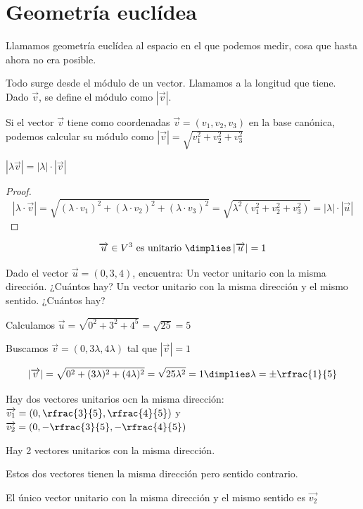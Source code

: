 
\section{Geometría euclídea}

Llamamos geometría euclídea al espacio en el que podemos medir, cosa que hasta ahora no era posible.

Todo surge desde el módulo de un vector. Llamamos  a la longitud que tiene. Dado $\vec{v}$, se define el módulo como $|\vec{v}|$.

Si el vector $\vec{v}$ tiene como coordenadas $\vec{v} = (v_1,v_2,v_3)$ en la base canónica, podemos calcular su módulo como $|\vec{v}| = \sqrt{v_1^2+v_2^2+v_3^2}$

\begin{prop}
$\left|\lambda\vec{v}\right| = |\lambda|·|\vec{v}|$
\end{prop}
\begin{proof}
$$|\lambda·\vec{v}| = \sqrt{(\lambda·v_1)^2+(\lambda·v_2)^2+(\lambda·v_3)^2} = \sqrt{\lambda^2 (v_1^2+v_2^2+v_3^2)} = |\lambda| ·\left|\vec{u}\right|$$
\end{proof}

\begin{defn}
\[\vec{u}\in V^3 \text{ es unitario } \dimplies \left|\vec{u}\right|=1\]
\end{defn}

\begin{problem}
Dado el vector $\vec{u} = (0,3,4)$, encuentra:
\ppart Un vector unitario con la misma dirección. ¿Cuántos hay?
\ppart Un vector unitario con la misma dirección y el mismo sentido. ¿Cuántos hay?
\solution

Calculamos $\vec{u} = \sqrt{0^2+3^2+4^5} = \sqrt{25} = 5$

\spart Buscamos $\vec{v} = (0,3\lambda,4\lambda)$ tal que $|\vec{v}| = 1$

\[|\vec{v}| = \sqrt{0^2+(3\lambda)^2+(4\lambda)^2} = \sqrt{25\lambda^2} =1 \dimplies \lambda=\pm\rfrac{1}{5}\]

Hay dos vectores unitarios ocn la misma dirección: $\vec{v_1} = \left(0,\rfrac{3}{5},\rfrac{4}{5}\right)$ y $\vec{v_2} = \left(0,-\rfrac{3}{5},-\rfrac{4}{5}\right)$

Hay 2 vectores unitarios con la misma dirección.

\obs Estos dos vectores tienen la misma dirección pero sentido contrario.

\spart El único vector unitario con la misma dirección y el mismo sentido es $\vec{v_2}$

\end{problem}

